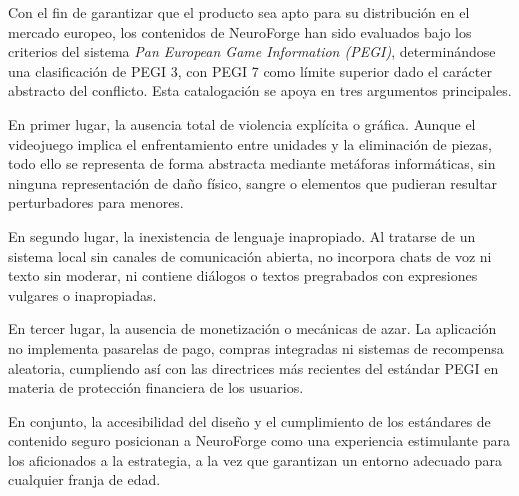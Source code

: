 Con el fin de garantizar que el producto sea apto para su distribución en el mercado europeo, los contenidos de NeuroForge han sido evaluados bajo los criterios del sistema \textit{Pan European Game Information (PEGI)}, determinándose una clasificación de PEGI 3, con PEGI 7 como límite superior dado el carácter abstracto del conflicto. Esta catalogación se apoya en tres argumentos principales.

En primer lugar, la ausencia total de violencia explícita o gráfica. Aunque el videojuego implica el enfrentamiento entre unidades y la eliminación de piezas, todo ello se representa de forma abstracta mediante metáforas informáticas, sin ninguna representación de daño físico, sangre o elementos que pudieran resultar perturbadores para menores.

En segundo lugar, la inexistencia de lenguaje inapropiado. Al tratarse de un sistema local sin canales de comunicación abierta, no incorpora chats de voz ni texto sin moderar, ni contiene diálogos o textos pregrabados con expresiones vulgares o inapropiadas.

En tercer lugar, la ausencia de monetización o mecánicas de azar. La aplicación no implementa pasarelas de pago, compras integradas ni sistemas de recompensa aleatoria, cumpliendo así con las directrices más recientes del estándar PEGI en materia de protección financiera de los usuarios.

En conjunto, la accesibilidad del diseño y el cumplimiento de los estándares de contenido seguro posicionan a NeuroForge como una experiencia estimulante para los aficionados a la estrategia, a la vez que garantizan un entorno adecuado para cualquier franja de edad.